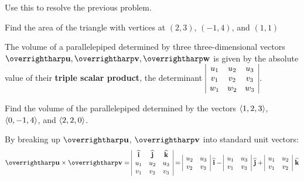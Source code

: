 \documentclass[letterpaper, twoside, 12pt]{book}
\begin{document}
\begin{problem}
  Use this to resolve the previous problem.
\end{problem}

\begin{problem}
  Find the area of the triangle with vertices at \((2,3)\), \((-1,4)\),
  and \((1,1)\)
\end{problem}

\begin{theorem}
  The volume of a parallelepiped determined by three three-dimensional
  vectors \(\harpvec u,\harpvec v,\harpvec w\) is given by the absolute
  value of their
  \textbf{triple scalar product}, the determinant
  \(
    \begin{array}{|c c c|}
    u_1 & u_2 & u_3 \\
    v_1 & v_2 & v_3 \\
    w_1 & w_2 & w_3 \\
    \end{array}
  \).
\end{theorem}

\begin{problem}
  Find the volume of the parallelepiped determined by the vectors
  \(\langle1,2,3\rangle\), \(\langle0,-1,4\rangle\), and \(\langle2,2,0\rangle\).
\end{problem}



\begin{theorem}
  By breaking up $\harpvec{u}$, $\harpvec{v}$ into standard unit vectors:
  \[
  \harpvec{u} \times \harpvec{v}
    =
  \begin{array}{|c c c|}
  \veci & \vecj & \veck \\
  u_1 & u_2 & u_3 \\
  v_1 & v_2 & v_3 \\
  \end{array}
    =
  \begin{array}{|c c|}
  u_2 & u_3 \\
  v_2 & v_3 \\
  \end{array}
  ~\veci-
  \begin{array}{|c c|}
  u_1 & u_3 \\
  v_1 & v_3 \\
  \end{array}
  ~\vecj+
  \begin{array}{|c c|}
  u_1 & u_2 \\
  v_1 & v_2 \\
  \end{array}
  ~\veck
  \]
\end{theorem}
\end{document}
